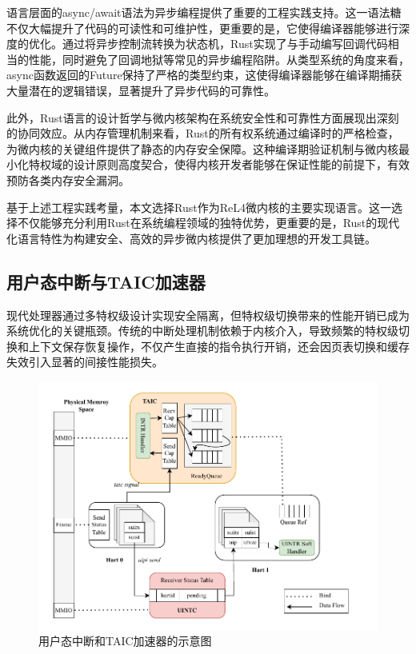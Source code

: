 语言层面的async/await语法为异步编程提供了重要的工程实践支持。这一语法糖不仅大幅提升了代码的可读性和可维护性，更重要的是，它使得编译器能够进行深度的优化。通过将异步控制流转换为状态机，Rust实现了与手动编写回调代码相当的性能，同时避免了回调地狱等常见的异步编程陷阱。从类型系统的角度来看，async函数返回的Future保持了严格的类型约束，这使得编译器能够在编译期捕获大量潜在的逻辑错误，显著提升了异步代码的可靠性。

此外，Rust语言的设计哲学与微内核架构在系统安全性和可靠性方面展现出深刻的协同效应。从内存管理机制来看，Rust的所有权系统通过编译时的严格检查，为微内核的关键组件提供了静态的内存安全保障。这种编译期验证机制与微内核最小化特权域的设计原则高度契合，使得内核开发者能够在保证性能的前提下，有效预防各类内存安全漏洞。

基于上述工程实践考量，本文选择Rust作为ReL4微内核的主要实现语言。这一选择不仅能够充分利用Rust在系统编程领域的独特优势，更重要的是，Rust的现代化语言特性为构建安全、高效的异步微内核提供了更加理想的开发工具链。

\subsection{用户态中断与TAIC加速器}

现代处理器通过多特权级设计实现安全隔离，但特权级切换带来的性能开销已成为系统优化的关键瓶颈。传统的中断处理机制依赖于内核介入，导致频繁的特权级切换和上下文保存恢复操作，不仅产生直接的指令执行开销，还会因页表切换和缓存失效引入显著的间接性能损失。

\begin{figure}[htbp]
    \centering
    \includegraphics[width=1.0\textwidth]{figures/uintc_taic.drawio.pdf}
    \caption{用户态中断和TAIC加速器的示意图}\label{fig:uintc_taic}
\end{figure}


